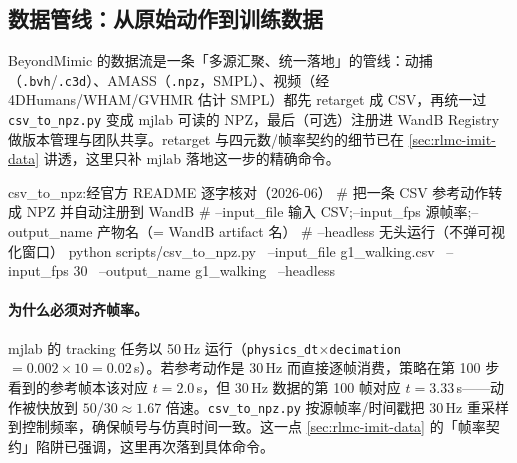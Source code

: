 \subsection{数据管线：从原始动作到训练数据}
\label{sec:rlmc-mi-mjlab-data}

BeyondMimic 的数据流是一条「多源汇聚、统一落地」的管线：动捕（\verb|.bvh|/\allowbreak\verb|.c3d|）、AMASS（\verb|.npz|，SMPL）、视频（经 4DHumans/WHAM/GVHMR 估计 SMPL）都先 retarget 成 CSV，再统一过 \verb|csv_to_npz.py| 变成 mjlab 可读的 NPZ，最后（可选）注册进 WandB Registry 做版本管理与团队共享。retarget 与四元数/帧率契约的细节已在 \cref{sec:rlmc-imit-data} 讲透，这里只补 mjlab 落地这一步的精确命令。


\begin{codebox}[bash]{csv\_to\_npz:经官方 README 逐字核对（2026-06）}
# 把一条 CSV 参考动作转成 NPZ 并自动注册到 WandB
# --input_file 输入 CSV;--input_fps 源帧率;--output_name 产物名（= WandB artifact 名）
# --headless 无头运行（不弹可视化窗口）
python scripts/csv_to_npz.py \
    --input_file g1_walking.csv \
    --input_fps 30 \
    --output_name g1_walking \
    --headless
\end{codebox}

\paragraph{为什么必须对齐帧率。}mjlab 的 tracking 任务以 50\,Hz 运行（\verb|physics_dt|$\times$\verb|decimation|$=0.002\times10=0.02$\,s）。若参考动作是 30\,Hz 而直接逐帧消费，策略在第 100 步看到的参考帧本该对应 $t=2.0$\,s，但 30\,Hz 数据的第 100 帧对应 $t=3.33$\,s——动作被快放到 $50/30\approx1.67$ 倍速。\verb|csv_to_npz.py| 按源帧率/时间戳把 30\,Hz 重采样到控制频率，确保帧号与仿真时间一致。这一点 \cref{sec:rlmc-imit-data} 的「帧率契约」陷阱已强调，这里再次落到具体命令。

